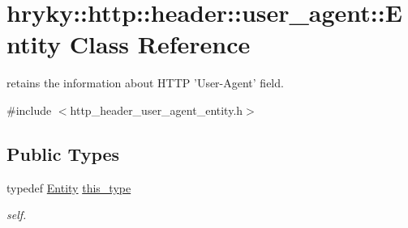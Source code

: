 \hypertarget{classhryky_1_1http_1_1header_1_1user__agent_1_1_entity}{\section{hryky\-:\-:http\-:\-:header\-:\-:user\-\_\-agent\-:\-:Entity Class Reference}
\label{classhryky_1_1http_1_1header_1_1user__agent_1_1_entity}
}


retains the information about H\-T\-T\-P 'User-\/\-Agent' field.  




{\ttfamily \#include $<$http\-\_\-header\-\_\-user\-\_\-agent\-\_\-entity.\-h$>$}

\subsection*{Public Types}
\begin{DoxyCompactItemize}
\item 
\hypertarget{classhryky_1_1http_1_1header_1_1user__agent_1_1_entity_a762ebf4d79494c778eca1e49c38c758c}{typedef \hyperlink{classhryky_1_1http_1_1header_1_1user__agent_1_1_entity}{Entity} \hyperlink{classhryky_1_1http_1_1header_1_1user__agent_1_1_entity_a762ebf4d79494c778eca1e49c38c758c}{this\-\_\-type}}\label{classhryky_1_1http_1_1header_1_1user__agent_1_1_entity_a762ebf4d79494c778eca1e49c38c758c}

\begin{DoxyCompactList}\small\item\em self. \end{DoxyCompactList}\end{DoxyCompactItemize}
